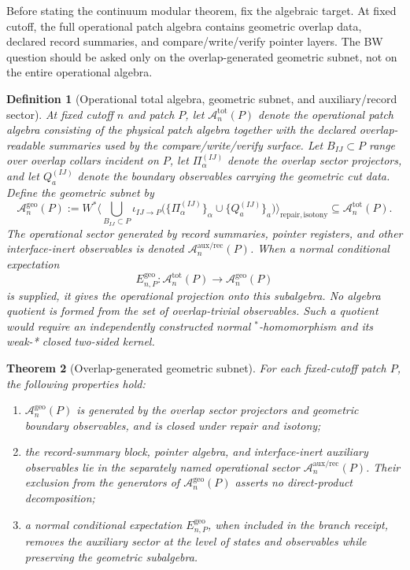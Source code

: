 \documentclass[11pt]{article}
\newtheorem{theorem}{Theorem}[section]
\newtheorem{definition}[theorem]{Definition}
\begin{document}
Before stating the continuum modular theorem, fix the algebraic target. At fixed cutoff, the full operational patch algebra contains geometric overlap data, declared record summaries, and compare/write/verify pointer layers. The BW question should be asked only on the overlap-generated geometric subnet, not on the entire operational algebra.

\begin{definition}[Operational total algebra, geometric subnet, and auxiliary/record sector]\label{def:geosubnet}
At fixed cutoff \(n\) and patch \(P\), let \(\mathcal A_n^{\mathrm{tot}}(P)\) denote the operational patch algebra consisting of the physical patch algebra together with the declared overlap-readable summaries used by the compare/write/verify surface. Let \(B_{IJ}\subset P\) range over overlap collars incident on \(P\), let \(\Pi_\alpha^{(IJ)}\) denote the overlap sector projectors, and let \(Q_a^{(IJ)}\) denote the boundary observables carrying the geometric cut data. Define the geometric subnet by
\[
\mathcal A_n^{\mathrm{geo}}(P)
:=
W^\ast\!\Big\langle
\bigcup_{B_{IJ}\subset P}
\iota_{IJ\to P}\!\bigl(
\{\Pi_\alpha^{(IJ)}\}_\alpha\cup\{Q_a^{(IJ)}\}_a
\bigr)
\Big\rangle_{\mathrm{repair,isotony}}
\subseteq \mathcal A_n^{\mathrm{tot}}(P).
\]
The operational sector generated by record summaries, pointer registers, and other interface-inert
observables is denoted \(\mathcal A_n^{\mathrm{aux/rec}}(P)\). When a normal conditional
expectation
\[
E_{n,P}^{\mathrm{geo}}:\mathcal A_n^{\mathrm{tot}}(P)
\longrightarrow \mathcal A_n^{\mathrm{geo}}(P)
\]
is supplied, it gives the operational projection onto this subalgebra. No algebra quotient is
formed from the set of overlap-trivial observables. Such a quotient would require an independently
constructed normal \(^*\)-homomorphism and its weak-* closed two-sided kernel.
\end{definition}

\begin{theorem}[Overlap-generated geometric subnet]\label{thm:geosubnet}
For each fixed-cutoff patch \(P\), the following properties hold:
\begin{enumerate}[label=\textup{(\roman*)},leftmargin=2em]
\item \(\mathcal A_n^{\mathrm{geo}}(P)\) is generated by the overlap sector projectors and geometric boundary observables, and is closed under repair and isotony;
\item the record-summary block, pointer algebra, and interface-inert auxiliary observables lie in the separately named operational sector \(\mathcal A_n^{\mathrm{aux/rec}}(P)\). Their exclusion from the generators of \(\mathcal A_n^{\mathrm{geo}}(P)\) asserts no direct-product decomposition;
\item a normal conditional expectation \(E_{n,P}^{\mathrm{geo}}\), when included in the branch
receipt, removes the auxiliary sector at the level of states and observables while preserving the
geometric subalgebra.
\end{enumerate}
\end{theorem}
\end{document}
